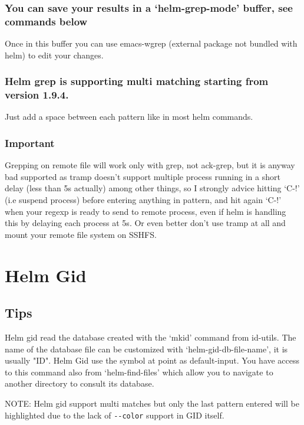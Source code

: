 \documentclass[11pt]{article}
\begin{document}
\subsubsection{You can save your results in a ‘helm-grep-mode’ buffer, see commands below}
\label{sec:org05228b5}

Once in this buffer you can use emacs-wgrep (external package not bundled with helm)
to edit your changes.

\subsubsection{Helm grep is supporting multi matching starting from version 1.9.4.}
\label{sec:org50f9d72}
Just add a space between each pattern like in most helm commands.

\subsubsection{Important}
\label{sec:orgbc367ff}

Grepping on remote file will work only with grep, not ack-grep, but it is
anyway bad supported as tramp doesn’t support multiple process running in a
short delay (less than 5s actually) among other things,
so I strongly advice hitting ‘C-!’ (i.e suspend process)
before entering anything in pattern, and hit again ‘C-!’ when
your regexp is ready to send to remote process, even if helm is handling
this by delaying each process at 5s. 
Or even better don’t use tramp at all and mount your remote file system on SSHFS.

\section{Helm Gid}
\label{sec:org690a930}

\subsection{Tips}
\label{sec:org303ff94}

Helm gid read the database created with the ‘mkid’ command from id-utils.
The name of the database file can be customized with ‘helm-gid-db-file-name’, it
is usually "ID".
Helm Gid use the symbol at point as default-input.
You have access to this command also from ‘helm-find-files’ which allow you to
navigate to another directory to consult its database.

NOTE: Helm gid support multi matches but only the last pattern entered will be
highlighted due to the lack of \texttt{-{}-color} support in GID itself.
\end{document}

